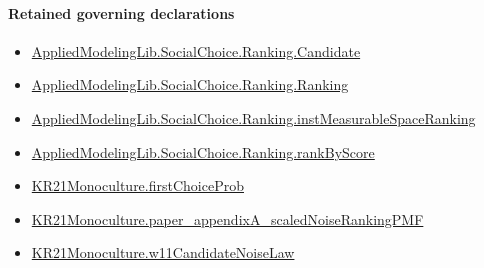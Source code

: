 \documentclass[10pt]{article}
\begin{document}
\paragraph{Retained governing declarations}
\begin{itemize}\raggedright
\item \hyperlink{library-prerequisite-8c0e6c25845ae78a}{Applied\allowbreak{}Modeling\allowbreak{}Lib.\allowbreak{}Social\allowbreak{}Choice.\allowbreak{}Ranking.\allowbreak{}Candidate}
\item \hyperlink{library-prerequisite-5cde54446d1ae021}{Applied\allowbreak{}Modeling\allowbreak{}Lib.\allowbreak{}Social\allowbreak{}Choice.\allowbreak{}Ranking.\allowbreak{}Ranking}
\item \hyperlink{governing-declaration-30ca9c740ef703ec}{Applied\allowbreak{}Modeling\allowbreak{}Lib.\allowbreak{}Social\allowbreak{}Choice.\allowbreak{}Ranking.\allowbreak{}inst\allowbreak{}Measurable\allowbreak{}Space\allowbreak{}Ranking}
\item \hyperlink{governing-declaration-c2e98278351275b0}{Applied\allowbreak{}Modeling\allowbreak{}Lib.\allowbreak{}Social\allowbreak{}Choice.\allowbreak{}Ranking.\allowbreak{}rank\allowbreak{}By\allowbreak{}Score}
\item \hyperlink{governing-declaration-93eb0433da315974}{KR21\allowbreak{}Monoculture.\allowbreak{}first\allowbreak{}Choice\allowbreak{}Prob}
\item \hyperlink{governing-declaration-8ae267e23d0028a9}{KR21\allowbreak{}Monoculture.\allowbreak{}paper\_\allowbreak{}appendix\allowbreak{}A\_\allowbreak{}scaled\allowbreak{}Noise\allowbreak{}Ranking\allowbreak{}PMF}
\item \hyperlink{governing-declaration-c03b4b3d907f0eef}{KR21\allowbreak{}Monoculture.\allowbreak{}w11\allowbreak{}Candidate\allowbreak{}Noise\allowbreak{}Law}
\end{itemize}
\end{document}
